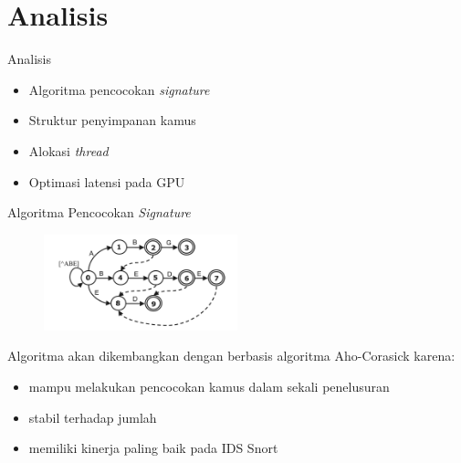 \documentclass[10pt]{beamer}
\begin{document}
\section{Analisis}

\begin{frame}{Analisis}
    \begin{itemize}

        \item Algoritma pencocokan \emph{signature}

        \item Struktur penyimpanan kamus

        \item Alokasi \emph{thread}

        \item Optimasi latensi pada GPU

    \end{itemize}
\end{frame}

\begin{frame}{Algoritma Pencocokan \emph{Signature}}
    \begin{figure}
        \centering
        \includegraphics[width=0.5\textwidth]{../src/resources/aho-c.png}
    \end{figure}

    Algoritma akan dikembangkan dengan berbasis algoritma Aho-Corasick karena:
    \begin{itemize}
        \item mampu melakukan pencocokan kamus dalam sekali penelusuran
        \item stabil terhadap jumlah 
        \item memiliki kinerja paling baik pada IDS Snort
    \end{itemize}
\end{frame}
\end{document}

